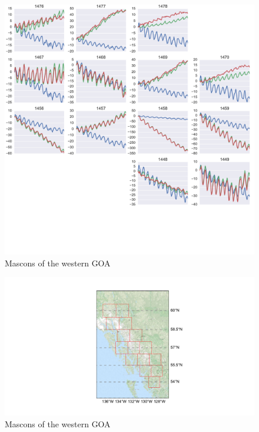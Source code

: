 \documentclass[review,oneside]{igs}
\begin{document}
\begin{figure}
\noindent\includegraphics[width=178mm]{figures/easternPlot} \centering \caption{Mascons of the western GOA} \label{fig:summer}
\end{figure}


\begin{figure}
\noindent\includegraphics[width=178mm]{figures/southeasternMap} \centering \caption{Mascons of the western GOA} \label{fig:summer}
\end{figure}
\end{document}
